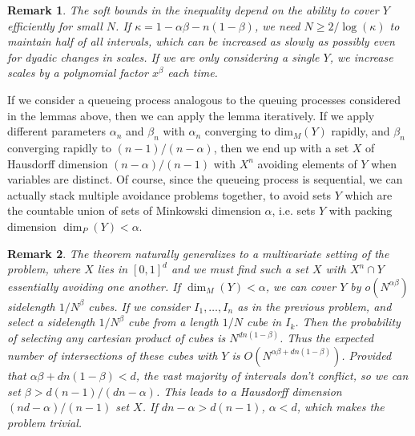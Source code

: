 \documentclass{report}
\theoremstyle{plain}
\theoremstyle{plain}
\newtheorem*{remark}{Remark}
\begin{document}
\begin{remark}
    The soft bounds in the inequality depend on the ability to cover $Y$ efficiently for small $N$. If $\kappa = 1 - \alpha \beta - n(1 - \beta)$, we need $N \geq 2/\log(\kappa)$ to maintain half of all intervals, which can be increased as slowly as possibly even for dyadic changes in scales. If we are only considering a single $Y$, we increase scales by a polynomial factor $x^\beta$ each time.
\end{remark}

If we consider a queueing process analogous to the queuing processes considered in the lemmas above, then we can apply the lemma iteratively. If we apply different parameters $\alpha_n$ and $\beta_n$ with $\alpha_n$ converging to $\text{dim}_M(Y)$ rapidly, and $\beta_n$ converging rapidly to $(n - 1)/(n-\alpha)$, then we end up with a set $X$ of Hausdorff dimension $(n - \alpha)/(n-1)$ with $X^n$ avoiding elements of $Y$ when variables are distinct. Of course, since the queueing process is sequential, we can actually stack multiple avoidance problems together, to avoid sets $Y$ which are the countable union of sets of Minkowski dimension $\alpha$, i.e. sets $Y$ with packing dimension $\dim_P(Y) < \alpha$.

\begin{remark}
    The theorem naturally generalizes to a multivariate setting of the problem, where $X$ lies in $[0,1]^d$ and we must find such a set $X$ with $X^n \cap Y$ essentially avoiding one another. If $\dim_M(Y) < \alpha$, we can cover $Y$ by $o(N^{\alpha \beta})$ sidelength $1/N^\beta$ cubes. If we consider $I_1, \dots, I_n$ as in the previous problem, and select a sidelength $1/N^\beta$ cube from a length $1/N$ cube in $I_k$. Then the probability of selecting any cartesian product of cubes is $N^{dn(1 - \beta)}$. Thus the expected number of intersections of these cubes with $Y$ is $O(N^{\alpha \beta + dn(1 - \beta)})$. Provided that $\alpha \beta + dn(1 - \beta) < d$, the vast majority of intervals don't conflict, so we can set $\beta > d(n - 1)/(dn - \alpha)$. This leads to a Hausdorff dimension $(nd - \alpha)/(n - 1)$ set $X$. If $dn - \alpha > d(n-1)$, $\alpha < d$, which makes the problem trivial.
\end{remark}
\end{document}
